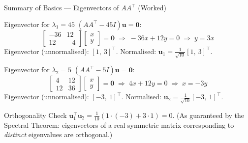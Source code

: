 \documentclass{beamer}
\begin{document}
\begin{frame}[shrink=10]{Summary of Basics --- Eigenvectors of $AA^\top$ (Worked)}
  \begin{block}{Eigenvector for $\lambda_1 = 45$}
    $(AA^\top - 45I)\mathbf{u} = \mathbf{0}$:
    \[
      \begin{bmatrix}-36&12\\12&-4\end{bmatrix}
      \begin{bmatrix}x\\y\end{bmatrix}
      = \mathbf{0}
      \;\Rightarrow\; -36x + 12y = 0 \;\Rightarrow\; y = 3x
    \]
    Eigenvector (unnormalised): $[1,\ 3]^\top$.
    Normalised:
    $\mathbf{u}_1 = \frac{1}{\sqrt{10}}[1,\ 3]^\top$.
  \end{block}

  \begin{block}{Eigenvector for $\lambda_2 = 5$}
    $(AA^\top - 5I)\mathbf{u} = \mathbf{0}$:
    \[
      \begin{bmatrix}4&12\\12&36\end{bmatrix}
      \begin{bmatrix}x\\y\end{bmatrix}
      = \mathbf{0}
      \;\Rightarrow\; 4x + 12y = 0 \;\Rightarrow\; x = -3y
    \]
    Eigenvector (unnormalised): $[-3,\ 1]^\top$.
    Normalised:
    $\mathbf{u}_2 = \frac{1}{\sqrt{10}}[-3,\ 1]^\top$.
  \end{block}

  \begin{exampleblock}{Orthogonality Check}
    $\mathbf{u}_1^\top\mathbf{u}_2
     = \frac{1}{10}(1\cdot(-3) + 3\cdot 1) = 0$. \checkmark\;
    (As guaranteed by the Spectral Theorem: eigenvectors of a real
    symmetric matrix corresponding to \emph{distinct} eigenvalues
    are orthogonal.)
  \end{exampleblock}
\end{frame}
\end{document}
